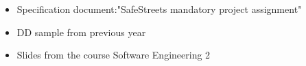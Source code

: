\begin{itemize}
	\item
	Specification document:"SafeStreets mandatory project assignment"
	\item 
	DD sample from previous year
	\item 
	Slides from the course Software Engineering 2
\end{itemize}